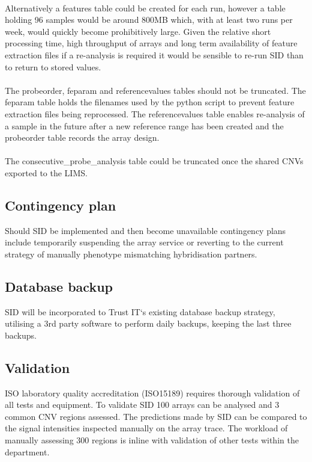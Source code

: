 \paragraph*{}
Alternatively a features table could be created for each run, however a table holding 96 samples would be around 800MB which, with at least two runs per week, would quickly become prohibitively large. Given the relative short processing time, high throughput of arrays and long term availability of feature extraction files if a re-analysis is required it would be sensible to re-run SID than to return to stored values.
\paragraph*{}
The probeorder, feparam and referencevalues tables should not be truncated. The feparam table holds the filenames used by the python script to prevent feature extraction files being reprocessed.  The referencevalues table enables re-analysis of a sample in the future after a new reference range has been created and the probeorder table records the array design.
\paragraph*{}
The consecutive\_probe\_analysis table could be truncated once the shared CNVs exported to the LIMS.

\subsection{Contingency plan}
Should SID be implemented and then become unavailable contingency plans include temporarily suspending the array service or reverting to the current strategy of manually phenotype mismatching hybridisation partners.
\subsection{Database backup}
SID will be incorporated to Trust IT`s existing database backup strategy, utilising a 3rd party software to perform daily backups, keeping the last three backups. 

\subsection{Validation}
ISO laboratory quality accreditation (ISO15189) requires thorough validation of all tests and equipment. To validate SID 100 arrays can be analysed and 3 common CNV regions assessed. The predictions made by SID can be compared to the signal intensities inspected manually on the array trace. The workload of manually assessing 300 regions is inline with validation of other tests within the department.

